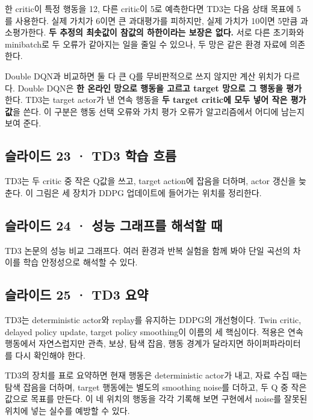 \documentclass[11pt,a4paper]{article}
\begin{document}
한 critic이 특정 행동을 12, 다른 critic이 5로 예측한다면 TD3는 다음 상태 목표에 5를 사용한다. 실제 가치가 6이면 큰 과대평가를 피하지만, 실제 가치가 10이면 5만큼 과소평가한다. \textbf{두 추정의 최솟값이 참값의 하한이라는 보장은 없다.} 서로 다른 초기화와 minibatch로 두 오류가 같아지는 일을 줄일 수 있으나, 두 망은 같은 환경 자료에 의존한다.\par

Double DQN과 비교하면 둘 다 큰 Q를 무비판적으로 쓰지 않지만 계산 위치가 다르다. Double DQN은 \textbf{한 온라인 망으로 행동을 고르고 target 망으로 그 행동을 평가}한다. TD3는 target actor가 낸 연속 행동을 \textbf{두 target critic에 모두 넣어 작은 평가값}을 쓴다. 이 구분은 행동 선택 오류와 가치 평가 오류가 알고리즘에서 어디에 남는지 보여 준다.\par

\subsection{슬라이드 23 · TD3 학습 흐름}

TD3는 두 critic 중 작은 Q값을 쓰고, target action에 잡음을 더하며, actor 갱신을 늦춘다. 이 그림은 세 장치가 DDPG 업데이트에 들어가는 위치를 정리한다.\par

\subsection{슬라이드 24 · 성능 그래프를 해석할 때}

TD3 논문의 성능 비교 그래프다. 여러 환경과 반복 실험을 함께 봐야 단일 곡선의 차이를 학습 안정성으로 해석할 수 있다.\par

\subsection{슬라이드 25 · TD3 요약}

TD3는 deterministic actor와 replay를 유지하는 DDPG의 개선형이다. Twin critic, delayed policy update, target policy smoothing이 이름의 세 핵심이다. 적용은 연속 행동에서 자연스럽지만 관측, 보상, 탐색 잡음, 행동 경계가 달라지면 하이퍼파라미터를 다시 확인해야 한다.\par

TD3의 장치를 표로 요약하면 현재 행동은 deterministic actor가 내고, 자료 수집 때는 탐색 잡음을 더하며, target 행동에는 별도의 smoothing noise를 더하고, 두 Q 중 작은 값으로 목표를 만든다. 이 네 위치의 행동을 각각 기록해 보면 구현에서 noise를 잘못된 위치에 넣는 실수를 예방할 수 있다.\par
\end{document}
